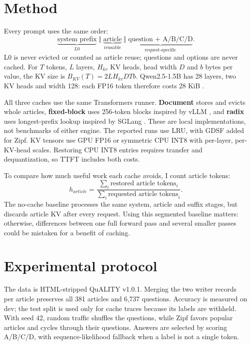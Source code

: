 \documentclass{article}
\begin{document}
\section{Method}

Every prompt uses the same order:
\[
 \underbrace{\text{system prefix}}_{L0}\;\Vert\;
 \underbrace{\text{article}}_{\text{reusable}}\;\Vert\;
 \underbrace{\text{question + A/B/C/D}}_{\text{request-specific}}.
\]
L0 is never evicted or counted as article reuse; questions and options are
never cached. For $T$ tokens, $L$ layers,
$H_{kv}$ KV heads, head width $D$ and $b$ bytes per value, the KV size is
$B_{KV}(T)=2LH_{kv}DTb$. Qwen2.5-1.5B has 28 layers, two KV heads and width
128: each FP16 token therefore costs 28 KiB \cite{yang2024qwen25}.

All three caches use the same Transformers runner. \textbf{Document} stores and
evicts whole articles, \textbf{fixed-block} uses 256-token blocks inspired by
vLLM \cite{kwon2023pagedattention}, and \textbf{radix} uses longest-prefix lookup
inspired by SGLang \cite{zheng2024sglang}. These are local implementations, not
benchmarks of either engine. The reported runs use LRU, with GDSF added for Zipf.
KV tensors use GPU FP16 or symmetric CPU INT8 with per-layer, per-KV-head
scales. Restoring CPU INT8 entries requires transfer and dequantization, so
TTFT includes both costs.

To compare how much useful work each cache avoids, I count article tokens:
\begin{equation}
 h_{article}=\frac{\sum_i\text{restored article tokens}_i}
 {\sum_i\text{requested article tokens}_i}.
\end{equation}
The no-cache baseline processes the same system, article and suffix stages,
but discards article KV after every request. Using this segmented baseline
matters: otherwise, differences between one full forward pass and several
smaller passes could be mistaken for a benefit of caching.

\section{Experimental protocol}

The data is HTML-stripped QuALITY v1.0.1. Merging the two writer records per
article preserves all 381 articles and 6,737 questions. Accuracy is measured
on dev; the test split is used only for cache traces because its labels are
withheld. With seed 42, random traffic shuffles the questions, while Zipf
favors popular articles and cycles through their questions. Answers are
selected by scoring A/B/C/D, with sequence-likelihood
fallback when a label is not a single token.
\end{document}
